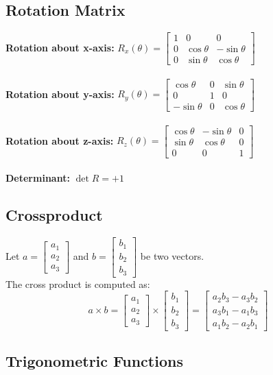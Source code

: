 \documentclass[10pt,a4paper]{article}
\newcommand{\vect}[1]{\ensuremath{\begin{bmatrix}#1\end{bmatrix}}}
\begin{document}
\subsection{Rotation Matrix}
\textbf{Rotation about x-axis:}
$R_x(\theta) = \begin{bmatrix}
1 & 0 & 0 \\
0 & \cos \theta & -\sin \theta \\
0 & \sin \theta & \cos \theta 
\end{bmatrix}$ \\
\\

\textbf{Rotation about y-axis:}
$R_y(\theta) = \begin{bmatrix}
\cos \theta & 0 & \sin \theta \\
0 & 1 & 0 \\
-\sin \theta & 0 & \cos \theta
\end{bmatrix}$ \\
\\

\textbf{Rotation about z-axis:}
$R_z(\theta) = \begin{bmatrix}
\cos \theta & -\sin \theta & 0 \\
\sin \theta & \cos \theta & 0 \\
0 & 0 & 1
\end{bmatrix}$ \\
\\

\textbf{Determinant:}
$\det R = +1$

\subsection{Crossproduct}
Let $a = \vect{a_1 \\ a_2 \\ a_3}$ and $b = \vect{b_1 \\ b_2 \\ b_3}$ be two vectors. \\
The cross product is computed as:
$$
a \times b = \vect{a_1 \\ a_2 \\ a_3} \times \vect{b_1 \\ b_2 \\ b_3} = \vect{a_2b_3 - a_3b_2 \\ a_3b_1 - a_1b_3 \\ a_1b_2 - a_2b_1}
$$

\subsection{Trigonometric Functions}
\end{document}
